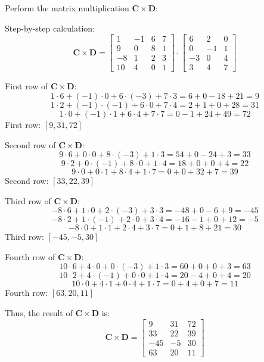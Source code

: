 \documentclass[12pt]{article}
\begin{document}
Perform the matrix multiplication \(\mathbf{C} \times \mathbf{D}\):

Step-by-step calculation:
\[
  \mathbf{C} \times \mathbf{D} = \begin{bmatrix}
    1  & -1 & 6 & 7 \\
    9  & 0  & 8 & 1 \\
    -8 & 1  & 2 & 3 \\
    10 & 4  & 0 & 1
  \end{bmatrix}
  \cdot
  \begin{bmatrix}
    6  & 2  & 0 \\
    0  & -1 & 1 \\
    -3 & 0  & 4 \\
    3  & 4  & 7
  \end{bmatrix}
\]

First row of \(\mathbf{C} \times \mathbf{D}\):
\[
  1 \cdot 6 + (-1) \cdot 0 + 6 \cdot (-3) + 7 \cdot 3 = 6 + 0 - 18 + 21 = 9
\]
\[
  1 \cdot 2 + (-1) \cdot (-1) + 6 \cdot 0 + 7 \cdot 4 = 2 + 1 + 0 + 28 = 31
\]
\[
  1 \cdot 0 + (-1) \cdot 1 + 6 \cdot 4 + 7 \cdot 7 = 0 - 1 + 24 + 49 = 72
\]
First row: \([9, 31, 72]\)

Second row of \(\mathbf{C} \times \mathbf{D}\):
\[
  9 \cdot 6 + 0 \cdot 0 + 8 \cdot (-3) + 1 \cdot 3 = 54 + 0 - 24 + 3 = 33
\]
\[
  9 \cdot 2 + 0 \cdot (-1) + 8 \cdot 0 + 1 \cdot 4 = 18 + 0 + 0 + 4 = 22
\]
\[
  9 \cdot 0 + 0 \cdot 1 + 8 \cdot 4 + 1 \cdot 7 = 0 + 0 + 32 + 7 = 39
\]
Second row: \([33, 22, 39]\)

Third row of \(\mathbf{C} \times \mathbf{D}\):
\[
  -8 \cdot 6 + 1 \cdot 0 + 2 \cdot (-3) + 3 \cdot 3 = -48 + 0 - 6 + 9 = -45
\]
\[
  -8 \cdot 2 + 1 \cdot (-1) + 2 \cdot 0 + 3 \cdot 4 = -16 - 1 + 0 + 12 = -5
\]
\[
  -8 \cdot 0 + 1 \cdot 1 + 2 \cdot 4 + 3 \cdot 7 = 0 + 1 + 8 + 21 = 30
\]
Third row: \([-45, -5, 30]\)

Fourth row of \(\mathbf{C} \times \mathbf{D}\):
\[
  10 \cdot 6 + 4 \cdot 0 + 0 \cdot (-3) + 1 \cdot 3 = 60 + 0 + 0 + 3 = 63
\]
\[
  10 \cdot 2 + 4 \cdot (-1) + 0 \cdot 0 + 1 \cdot 4 = 20 - 4 + 0 + 4 = 20
\]
\[
  10 \cdot 0 + 4 \cdot 1 + 0 \cdot 4 + 1 \cdot 7 = 0 + 4 + 0 + 7 = 11
\]
Fourth row: \([63, 20, 11]\)

Thus, the result of \(\mathbf{C} \times \mathbf{D}\) is:
\[
  \mathbf{C} \times \mathbf{D} = \begin{bmatrix}
    9   & 31 & 72 \\
    33  & 22 & 39 \\
    -45 & -5 & 30 \\
    63  & 20 & 11
  \end{bmatrix}
\]
\end{document}

